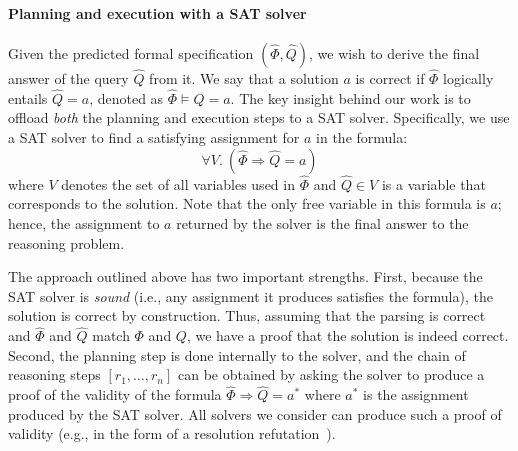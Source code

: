\documentclass{article}
\theoremstyle{definition}
\newcommand\gd[1]{\todo[color=red!40]{{\bf Greg}: #1}}
\newcommand{\spec}{\Phi}
\newcommand{\query}{Q}
\begin{document}
\paragraph{Planning and execution with a SAT solver} Given the predicted formal specification $(\hat{\spec}, \hat{\query})$, we wish to derive the final answer of the query $\hat{\query}$  from it. 
We say that a solution $a$ is correct if $\hat{\spec}$ logically entails $\hat{\query}=a$, denoted as $\hat{\spec} \models \hat{\query} = a$. The key insight behind our work is to offload \emph{both} the planning and execution steps to a SAT solver.
Specifically, we use a SAT solver to find a satisfying assignment for $a$ in the formula:
\footnotesize
\[
\forall V. \ (\hat{\spec} \Rightarrow \hat{\query} = a)\]
\normalsize
where $V$ denotes the set of all variables used in $\hat{\spec}$ and $\hat{\query} \in V$ is a variable that corresponds to the solution. Note that the only free variable in this formula is $a$; hence, the assignment to $a$ returned by the solver is the final answer to the reasoning problem.

The approach outlined above has two important strengths. First, because the SAT solver is \emph{sound} (i.e., any assignment it produces satisfies the formula), the solution is correct by construction. Thus, assuming that the parsing is correct and $\hat{\spec}$ and $\hat{\query}$ match $\spec$ and $\query$, we have a proof that the solution is indeed correct. Second, the planning step is done internally to the solver, and the chain of reasoning steps $[r_1, \ldots, r_n]$ can be obtained by asking the solver to produce a proof of the validity of the formula $\hat{\spec} \Rightarrow \hat{\query} = a^*$ where $a^*$ is the assignment produced by the SAT solver. All solvers we consider can produce such a proof of validity (e.g., in the form of a resolution refutation~\citep{resolution}).%

\end{document}
